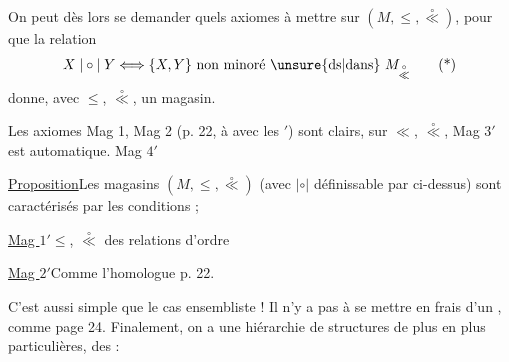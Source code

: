 On peut dès lors se demander quels axiomes à mettre sur $(M,\leq,\overset{\circ}{\ll})$, pour que la relation
\[
X\mathrel{|\circ|}Y\Longleftrightarrow\{X,Y\}\text{ non minoré \unsure{ds|dans} }M_{\overset{\circ}{\ll}}\tag*{(*)}
\]
 donne, avec $\leq$, $\overset{\circ}{\ll}$, un magasin.

Les axiomes Mag 1, Mag 2 (p. 22, à   avec les $'$) sont clairs,  sur $\ll$, $\overset{\circ}{\ll}$, \deleted{\unsure{\&}} Mag $3'$ est automatique. Mag $4'$  


\uline{Proposition}\quad Les magasins $(M,\leq,\overset{\circ}{\ll})$ (avec $\mathrel{|\circ|}$ définissable par \unsure{(*)} ci-dessus) sont caractérisés par les conditions ;

\uline{Mag $1'$}\quad $\leq$, $\overset{\circ}{\ll}$ des relations d'ordre

\uline{Mag $2'$}\quad Comme l'homologue p. 22.

\quad{}

C'est  aussi simple que le cas ensembliste ! Il n'y a pas à se mettre en frais d'un , comme page 24. Finalement, on a une hiérarchie de structures de plus en plus particulières, des  :


